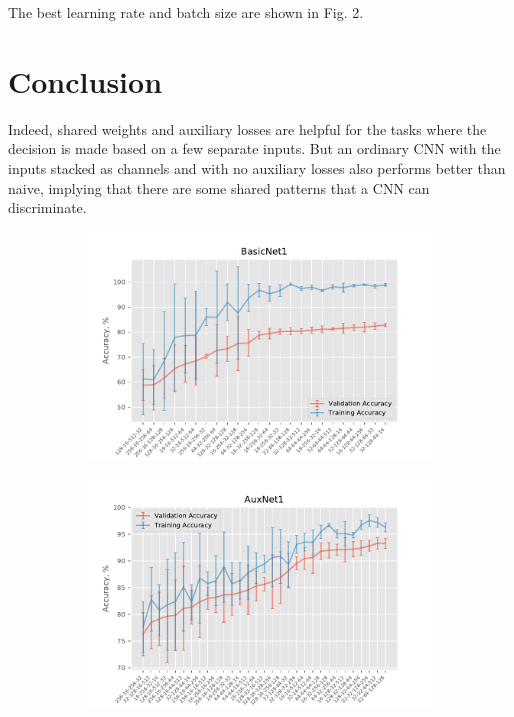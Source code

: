 \documentclass[10pt,conference,compsocconf]{IEEEtran}
\begin{document}
The best learning rate and batch size are shown in Fig. 2.

\section{Conclusion}
Indeed, shared weights and auxiliary losses are helpful for the tasks where the decision is made based on a few separate inputs. But an ordinary CNN with the inputs stacked as channels and with no auxiliary losses also performs better than naive, implying that there are some shared patterns that a CNN can discriminate.

\pagebreak

\begin{figure}
    \centering
    \begin{subfigure}[b]{0.475\textwidth}
        \centering
        \includegraphics[width=\textwidth]{BasicNet1.pdf}
        \label{fig:BasicNet1}
    \end{subfigure}
    \hfill
    \begin{subfigure}[b]{0.475\textwidth}  
        \centering 
        \includegraphics[width=\textwidth]{AuxNet1.pdf}

\end{subfigure}
\end{figure}
\end{document}
